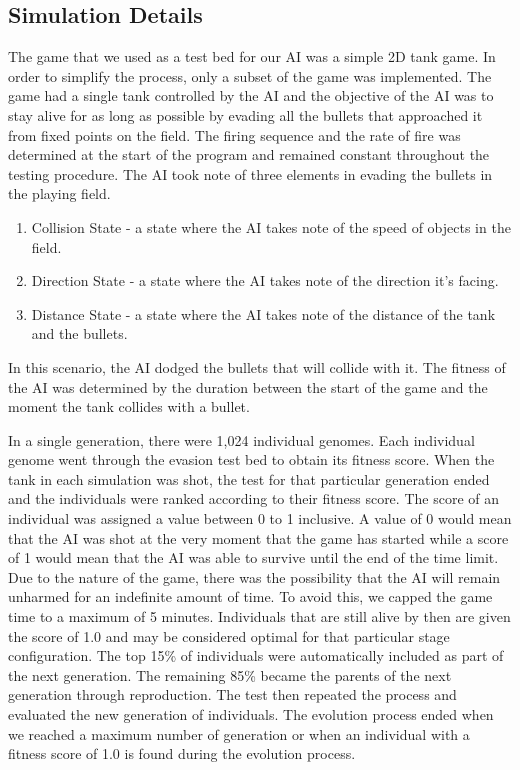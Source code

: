 \subsection{Simulation Details}
The game that we used as a test bed for our AI was a simple 2D tank game.
In order to simplify the process, only a subset of the game was implemented.
The game had a single tank controlled by the AI and the objective of the AI
was to stay alive for as long as possible by evading all the bullets that approached
it from fixed points on the field. The firing sequence and the rate
of fire was determined at the start of the program and remained constant throughout
the testing procedure. The AI took note of three elements in evading the
bullets in the playing field.

\begin{enumerate}
 \item Collision State - a state where the AI takes note of the speed 
of objects in the field.
 \item Direction State - a state where the AI takes note 
of the direction it's facing.
 \item Distance State - a state where the AI takes note of the distance 
of the tank and the bullets.
\end{enumerate}

In this scenario, the AI dodged the bullets that will collide with
it. The fitness of the AI was determined by the duration between the start of
the game and the moment the tank collides with a bullet.


In a single generation, there were 1,024 individual genomes. Each individual genome 
went through the evasion test bed to obtain its fitness score. When the tank in 
each simulation was shot, the test for that particular generation ended and the 
individuals were ranked according to their fitness score. The score of an individual 
was assigned a value between 0 to 1 inclusive. A value of 0 would mean that the AI was 
shot at the very moment that the game has started while a score of 1 would mean that 
the AI was able to survive until the end of the time limit. Due to the nature of the 
game, there was the possibility that the AI will remain unharmed for an indefinite 
amount of time. To avoid this, we capped the game time to a maximum of 5 minutes. 
Individuals that are still alive by then are given the score of 1.0 and may be considered 
optimal for that particular stage configuration. The top 15\% of individuals were 
automatically included as part of the next generation. The remaining 85\% became the 
parents of the next generation through reproduction. The test then repeated the 
process and evaluated the new generation of individuals. The evolution process ended
when we reached a maximum number of generation or when an individual with a fitness 
score of 1.0 is found during the evolution process.


